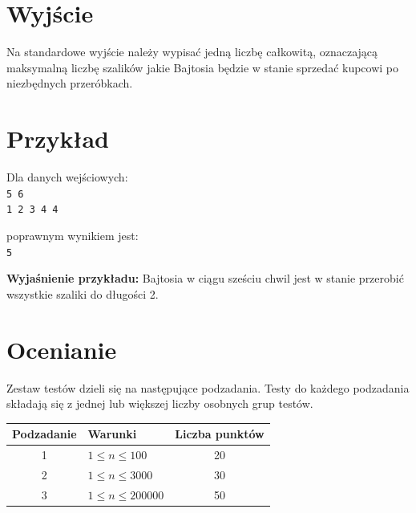\documentclass[10pt]{article}
\begin{document}
    \section*{Wyjście}
    
    Na standardowe wyjście należy wypisać jedną liczbę całkowitą, oznaczającą maksymalną liczbę szalików jakie Bajtosia będzie w stanie sprzedać kupcowi po niezbędnych przeróbkach.


    \section*{Przykład}
    
    \noindent
    \begin{minipage}[t]{0.5\textwidth}
        Dla danych wejściowych:\vspace{1ex}\\
        \texttt{5 6\\1 2 3 4 4}
    \end{minipage}
    \begin{minipage}[t]{0.5\textwidth}
        poprawnym wynikiem jest:\vspace{1ex}\\
        \texttt{5}
    \end{minipage}
    
    \vspace{2ex}
    \noindent\textbf{Wyjaśnienie przykładu:} Bajtosia w ciągu sześciu chwil jest w stanie przerobić wszystkie szaliki do długości 2.
    

    \section*{Ocenianie}
        
    Zestaw testów dzieli się na następujące podzadania. Testy do każdego podzadania składają się z jednej lub większej liczby osobnych grup testów.
    
    \begin{center}
        \begin{tabular}{ |c|p{9cm}|c| }
            \hline
            \textbf{Podzadanie} & \textbf{Warunki} & \textbf{Liczba punktów}\\
            \hline
            1 & $1\leq n\leq 100$ & 20\\
            \hline
            2 & $1\leq n\leq 3000$ & 30\\
            \hline
            3 & $1\leq n\leq 200000$ & 50\\
            \hline
        \end{tabular}
    \end{center}
\end{document}

